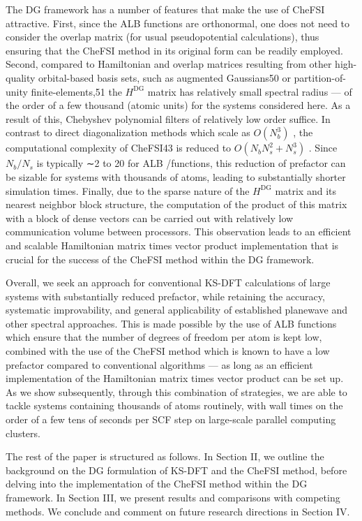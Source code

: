 \documentclass[
  10
]{article}
\begin{document}
The DG framework has a number of features that make the use of CheFSI
attractive. First, since the ALB functions are orthonormal, one does not
need to consider the overlap matrix (for usual pseudopotential
calculations), thus ensuring that the CheFSI method in its original form
can be readily employed. Second, compared to Hamiltonian and overlap
matrices resulting from other high-quality orbital-based basis sets,
such as augmented Gaussians50 or partition-of-unity finite-elements,51
the \(H ^ { \mathrm { D G } }\) matrix has relatively small spectral
radius --- of the order of a few thousand (atomic units) for the systems
considered here. As a result of this, Chebyshev polynomial filters of
relatively low order suffice. In contrast to direct diagonalization
methods which scale as \(O ( N _ { b } ^ { 3 } )\) , the computational
complexity of CheFSI43 is reduced to
\(O ( N _ { b } N _ { s } ^ { 2 } + N _ { s } ^ { 3 } )\) . Since
\(N _ { b } / N _ { s }\) is typically ∼2 to 20 for ALB /functions, this
reduction of prefactor can be sizable for systems with thousands of
atoms, leading to substantially shorter simulation times. Finally, due
to the sparse nature of the \(H ^ { \mathrm { D G } }\) matrix and its
nearest neighbor block structure, the computation of the product of this
matrix with a block of dense vectors can be carried out with relatively
low communication volume between processors. This observation leads to
an efficient and scalable Hamiltonian matrix times vector product
implementation that is crucial for the success of the CheFSI method
within the DG framework.

Overall, we seek an approach for conventional KS-DFT calculations of
large systems with substantially reduced prefactor, while retaining the
accuracy, systematic improvability, and general applicability of
established planewave and other spectral approaches. This is made
possible by the use of ALB functions which ensure that the number of
degrees of freedom per atom is kept low, combined with the use of the
CheFSI method which is known to have a low prefactor compared to
conventional algorithms --- as long as an efficient implementation of
the Hamiltonian matrix times vector product can be set up. As we show
subsequently, through this combination of strategies, we are able to
tackle systems containing thousands of atoms routinely, with wall times
on the order of a few tens of seconds per SCF step on large-scale
parallel computing clusters.

The rest of the paper is structured as follows. In Section II, we
outline the background on the DG formulation of KS-DFT and the CheFSI
method, before delving into the implementation of the CheFSI method
within the DG framework. In Section III, we present results and
comparisons with competing methods. We conclude and comment on future
research directions in Section IV.
\end{document}
